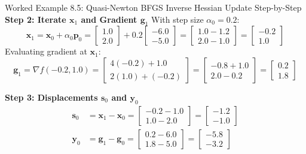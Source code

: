 \begin{examplebox}[breakable]{Worked Example 8.5: Quasi-Newton BFGS Inverse Hessian Update Step-by-Step}
\textbf{Step 2: Iterate $\mathbf{x}_1$ and Gradient $\mathbf{g}_1$}
With step size $\alpha_0 = 0.2$:
\begin{equation*}
\mathbf{x}_1 = \mathbf{x}_0 + \alpha_0 \mathbf{p}_0 = \begin{bmatrix} 1.0 \\ 2.0 \end{bmatrix} + 0.2 \begin{bmatrix} -6.0 \\ -5.0 \end{bmatrix} = \begin{bmatrix} 1.0 - 1.2 \\ 2.0 - 1.0 \end{bmatrix} = \mathbf{\begin{bmatrix} -0.2 \\ 1.0 \end{bmatrix}}
\end{equation*}
Evaluating gradient at $\mathbf{x}_1$:
\begin{equation*}
\mathbf{g}_1 = \nabla f(-0.2, 1.0) = \begin{bmatrix} 4(-0.2) + 1.0 \\ 2(1.0) + (-0.2) \end{bmatrix} = \begin{bmatrix} -0.8 + 1.0 \\ 2.0 - 0.2 \end{bmatrix} = \mathbf{\begin{bmatrix} 0.2 \\ 1.8 \end{bmatrix}}
\end{equation*}

\textbf{Step 3: Displacements $\mathbf{s}_0$ and $\mathbf{y}_0$}
\begin{align*}
\mathbf{s}_0 &= \mathbf{x}_1 - \mathbf{x}_0 = \begin{bmatrix} -0.2 - 1.0 \\ 1.0 - 2.0 \end{bmatrix} = \mathbf{\begin{bmatrix} -1.2 \\ -1.0 \end{bmatrix}} \\
\mathbf{y}_0 &= \mathbf{g}_1 - \mathbf{g}_0 = \begin{bmatrix} 0.2 - 6.0 \\ 1.8 - 5.0 \end{bmatrix} = \mathbf{\begin{bmatrix} -5.8 \\ -3.2 \end{bmatrix}}
\end{align*}


\end{examplebox}

